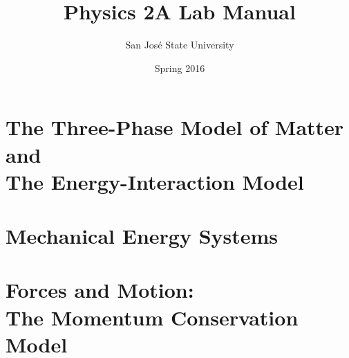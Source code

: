 \documentclass[12pt,onecolumn,letterpaper]{book}
\title{{\bf Physics 2A Lab Manual}
\iftoggle{instructor}
	{\\ {\Large Instructor Edition}}
	{\\ {\Large Student Edition}}
}
\author{San Jos\'{e} State University}
\date{Spring 2016}
\renewcommand{\chaptername}{DL}			%
\newcommand{\ThreePhaseModel}{\textbf{Three-Phase Model of Matter}}
\newcommand{\EnergyInteractionModel}{\textbf{Energy-Interaction Model}}
\newcommand{\pModel}{\textbf{Momentum Conservation Model}}
\begin{document}
%
%

\frontmatter

\maketitle
\thispagestyle{empty}\setcounter{page}{0}
\begingroup
	\hypersetup{linkcolor=black}		%
	\tableofcontents
	\listofFNTs
\endgroup


%
%

\mainmatter

\pagestyle{fancy}
	\fancyhf{}
	\fancyhead[LE,RO]{\chaptername\thechapter}		%
	\renewcommand{\footrulewidth}{0.4pt}	%
	\cfoot{\thepage}		%




			

\part[\ThreePhaseModel{} \& \EnergyInteractionModel{}]{The \ThreePhaseModel{}\\ and\\ The \EnergyInteractionModel{}}
\label{Unit1}

	
	
\part{Mechanical Energy Systems}
\label{Unit2}
	
	
	
\part[Forces and Motion: Momentum Conservation]{Forces and Motion:\\The \pModel{}}
\label{Unit6}
	
	
	
\end{document}
